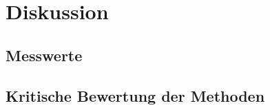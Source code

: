 \documentclass[../main.tex]{subfiles} %
\begin{document}
\chapter{Diskussion}\label{ch:diskussion}

    \section{Messwerte}\label{sec:messwerte}

    \section{Kritische Bewertung der Methoden}\label{sec:kritische-bewertung-der-methoden}
\end{document}
